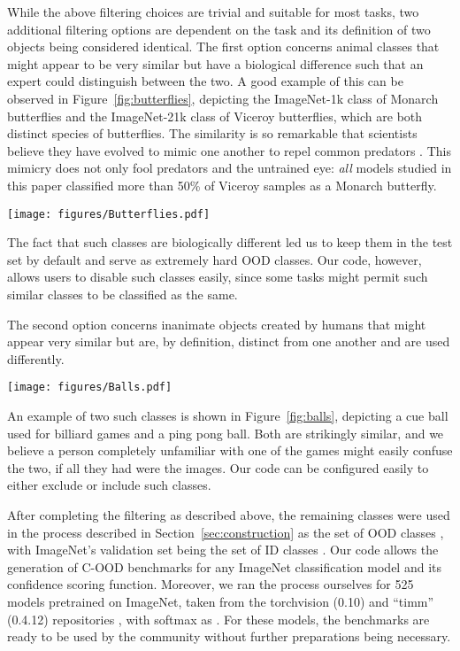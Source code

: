 \documentclass[table]{article} \usepackage{PRIMEarxiv}
\begin{document}
While the above filtering choices are trivial and suitable for most tasks, two additional filtering options are dependent on the task and its definition of two objects being considered identical.
The first option concerns animal classes that might appear to be very similar but have a biological difference such that an expert could distinguish between the two. A good example of this can be observed in Figure~\ref{fig:butterflies}, depicting the ImageNet-1k class of Monarch butterflies and the ImageNet-21k class of Viceroy butterflies, which are both distinct species of butterflies. The similarity is so remarkable that scientists believe they have evolved to mimic one another to repel common predators \citep{Ritland1991}. This mimicry does not only fool predators and the untrained eye: \emph{all} models studied in this paper classified more than 50\% of Viceroy samples as a Monarch butterfly.
\begin{figure*}[h]
    \centering
\texttt{[image: figures/Butterflies.pdf]}
    \caption{While both butterflies appear very similar, a Viceroy can be distinguished from a Monarch by a black line crossing its postmedian hindwing. The red arrow on the Viceroy image indicates this black line.}
    \label{fig:butterflies}
\end{figure*}
The fact that such classes are biologically different led us to keep them in the test set by default and serve as extremely hard OOD classes. Our code, however, allows users to disable such classes easily, since some tasks might permit such similar classes to be classified as the same.

The second option concerns inanimate objects created by humans that might appear very similar but are, by definition, distinct from one another and are used differently.
\begin{figure*}[h]
    \centering
\texttt{[image: figures/Balls.pdf]}
    \caption{While both balls appear similar, they are distinguished by their different uses.}
    \label{fig:balls}
\end{figure*}
An example of two such classes is shown in Figure~\ref{fig:balls}, depicting a cue ball used for billiard games and a ping pong ball. Both are strikingly similar, and we believe a person completely unfamiliar with one of the games might easily confuse the two, if all they had were the images. 
Our code can be configured easily to either exclude or include such classes.

After completing the filtering as described above, the remaining classes were used in the process described in Section~\ref{sec:construction} as the set of OOD classes , with ImageNet's validation set being the set of ID classes .
Our code allows the generation of C-OOD benchmarks for any ImageNet classification model and its  confidence scoring function. Moreover, we ran the process ourselves for 525 models pretrained on ImageNet, 
taken from the torchvision (0.10) and ``timm'' (0.4.12)
repositories \citep{NEURIPS2019_9015, rw2019timm}, with softmax as . For these models, the benchmarks are ready to be used by the community without further preparations being necessary.
\end{document}
